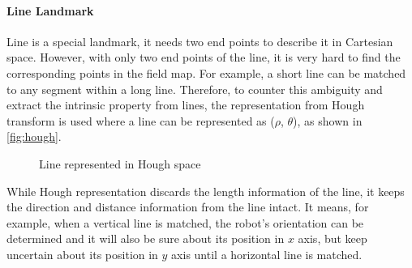 \paragraph{Line Landmark}\label{par:lineLandmark}
Line is a special landmark, it needs two end points to describe it in Cartesian space. However, with only two end points of the line, it is very hard to find the corresponding points in the field map. For example, a short line can be matched to any segment within a long line. Therefore, to counter this ambiguity and extract the intrinsic property from lines, the representation from Hough transform is used where a line can be represented as ($\rho$, $\theta$), as shown in \autoref{fig:hough}. 
\begin{figure}[h!]
  \centering
   \caption{Line represented in Hough space}
   \label{fig:hough}
 \end{figure}
While Hough representation discards the length information of the line, it keeps the direction and distance information from the line intact. It means, for example, when a vertical line is matched, the robot's orientation can be determined and it will also be sure about its position in $x$ axis, but keep uncertain about its position in $y$ axis until a horizontal line is matched.


